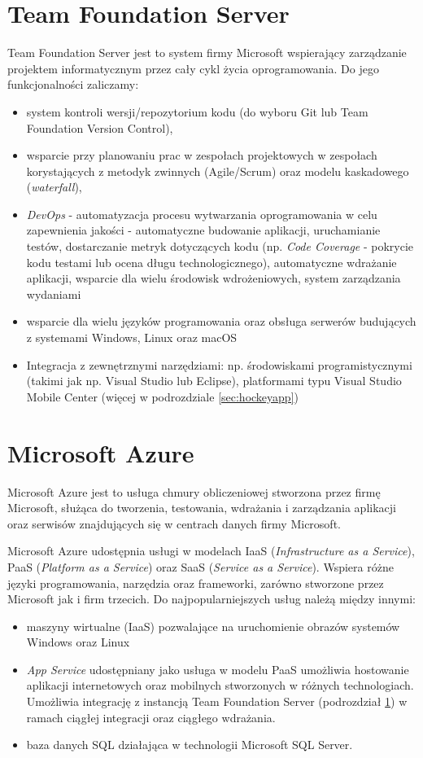 \section{Team Foundation Server}
\label{sec:team}
Team Foundation Server jest to system firmy Microsoft wspierający zarządzanie projektem informatycznym przez cały cykl życia oprogramowania.
Do jego funkcjonalności zaliczamy:
\begin{itemize}
\item system kontroli wersji/repozytorium kodu (do wyboru Git lub Team Foundation Version Control)\cite{Kontrola99:online},
\item wsparcie przy planowaniu prac w zespołach projektowych w zespołach korystających z metodyk zwinnych (Agile/Scrum) oraz modelu kaskadowego (\textit{waterfall})\cite{Narzedzi82:online},
\item \textit{DevOps} - automatyzacja procesu wytwarzania oprogramowania w celu zapewnienia jakości - automatyczne budowanie aplikacji, uruchamianie testów, dostarczanie metryk dotyczących kodu (np. \textit{Code Coverage} - pokrycie kodu testami lub ocena długu technologicznego), automatyczne wdrażanie aplikacji, wsparcie dla wielu środowisk wdrożeniowych, system zarządzania wydaniami\cite{Ciaglain95:online}
\item wsparcie dla wielu języków programowania oraz obsługa serwerów budujących z systemami Windows, Linux oraz macOS \cite{Buildand77:online}
\item Integracja z zewnętrznymi narzędziami: np. środowiskami programistycznymi (takimi jak np. Visual Studio lub Eclipse), platformami typu Visual Studio Mobile Center (więcej w podrozdziale \ref{sec:hockeyapp})
\end{itemize}
\section{Microsoft Azure}
\label{sec:azure}
Microsoft Azure jest to usługa chmury obliczeniowej stworzona przez firmę Microsoft, służąca do tworzenia, testowania, wdrażania i zarządzania aplikacji oraz serwisów znajdujących się w centrach danych firmy Microsoft.

Microsoft Azure udostępnia usługi w modelach IaaS (\textit{Infrastructure as a Service}), PaaS (\textit{Platform as a Service}) oraz SaaS (\textit{Service as a Service}). Wspiera różne języki programowania, narzędzia oraz frameworki, zarówno stworzone przez Microsoft jak i firm trzecich. 
\newpage
Do najpopularniejszych usług należą między innymi:
\begin{itemize}
\item maszyny wirtualne (IaaS) pozwalające na uruchomienie obrazów systemów Windows oraz Linux
\item \textit{App Service} udostępniany jako usługa w modelu PaaS umożliwia hostowanie aplikacji internetowych oraz mobilnych stworzonych w różnych technologiach. Umożliwia integrację z instancją Team Foundation Server (podrozdział \ref{sec:team}) w ramach ciągłej integracji oraz ciągłego wdrażania.
\item baza danych SQL działająca w technologii Microsoft SQL Server.
\end{itemize}
